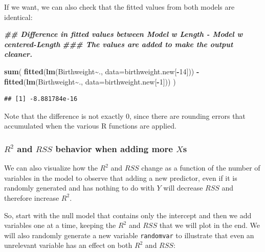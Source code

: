 \documentclass[
]{book}
\newenvironment{Shaded}{\begin{snugshade}}{\end{snugshade}}
\newcommand{\AttributeTok}[1]{\textcolor[rgb]{0.13,0.29,0.53}{#1}}
\newcommand{\DecValTok}[1]{\textcolor[rgb]{0.00,0.00,0.81}{#1}}
\newcommand{\DocumentationTok}[1]{\textcolor[rgb]{0.56,0.35,0.01}{\textbf{\textit{#1}}}}
\newcommand{\FunctionTok}[1]{\textcolor[rgb]{0.13,0.29,0.53}{\textbf{#1}}}
\newcommand{\NormalTok}[1]{#1}
\newcommand{\OtherTok}[1]{\textcolor[rgb]{0.56,0.35,0.01}{#1}}
\newcommand{\SpecialCharTok}[1]{\textcolor[rgb]{0.81,0.36,0.00}{\textbf{#1}}}
\begin{document}
If we want, we can also check that the fitted values from both models are identical:

\begin{Shaded}
\begin{Highlighting}[]
\DocumentationTok{\#\# Difference in fitted values between Model w \textasciigrave{}Length\textasciigrave{} {-}  Model w \textasciigrave{}centered{-}Length\textasciigrave{}}
\DocumentationTok{\#\#\# The values are added to make the output cleaner.}

\FunctionTok{sum}\NormalTok{( }\FunctionTok{fitted}\NormalTok{(}\FunctionTok{lm}\NormalTok{(Birthweight}\SpecialCharTok{\textasciitilde{}}\NormalTok{., }\AttributeTok{data=}\NormalTok{birthweight.new[}\SpecialCharTok{{-}}\DecValTok{14}\NormalTok{])) }\SpecialCharTok{{-}} \FunctionTok{fitted}\NormalTok{(}\FunctionTok{lm}\NormalTok{(Birthweight}\SpecialCharTok{\textasciitilde{}}\NormalTok{., }\AttributeTok{data=}\NormalTok{birthweight.new[}\SpecialCharTok{{-}}\DecValTok{1}\NormalTok{])) )}
\end{Highlighting}
\end{Shaded}

\begin{verbatim}
## [1] -8.881784e-16
\end{verbatim}

Note that the difference is not exactly 0, since there are rounding errors that accumulated when the various R functions are applied.

\subsubsection{\texorpdfstring{\(R^2\) and \(RSS\) behavior when adding more \(X\)s}{R\^{}2 and RSS behavior when adding more Xs}}\label{r2-and-rss-behavior-when-adding-more-xs}

We can also visualize how the \(R^2\) and \(RSS\) change as a function of the number of variables in the model to observe that adding a new predictor, even if it is randomly generated and has nothing to do with \(Y\) will decrease \(RSS\) and therefore increase \(R^2\).

So, start with the null model that contains only the intercept and then we add variables one at a time, keeping the \(R^2\) and \(RSS\) that we will plot in the end. We will also randomly generate a new variable \texttt{randomvar} to illustrate that even an unrelevant variable has an effect on both \(R^2\) and \(RSS\):

\begin{Shaded}
\end{Shaded}
\end{document}
